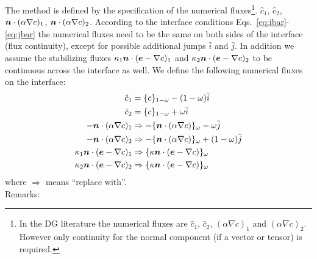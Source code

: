 The method is defined by the specification of the numerical fluxes\footnote{In
the DG literature the numerical fluxes are $\hat c_1$, $\hat c_2$, 
$(\alpha\nabla c)_1$ and $(\alpha\nabla c)_2$. However only continuity for
the normal component (if a vector or tensor) is required.}.
$\hat c_1$, $\hat c_2$, $\boldsymbol{n}\cdot(\alpha\nabla c)_1$,
$\boldsymbol{n}\cdot(\alpha\nabla c)_2$. 
According to the interface conditions Eqs.~\eqref{eq:ibar}-\eqref{eq:jbar} the
numerical fluxes need to be the same on both sides of the interface (flux
continuity), except for possible additional jumps $\bar i$ and $\bar j$. In
addition we assume the stabilizing fluxes 
$\kappa_1\boldsymbol{n}\cdot(\boldsymbol{e}- \nabla c)_1$
and $\kappa_2\boldsymbol{n}\cdot(\boldsymbol{e}- \nabla c)_2$ to be continuous across the
interface as well. We define the following numerical fluxes on the interface:
\begin{align}
   \hat c_1 &= \{c\}_{1-\omega}-(1-\omega)\bar i\\
   \hat c_2 &= \{c\}_{1-\omega}+\omega\bar i\\
   -\boldsymbol{n}\cdot(\alpha\nabla c)_1&\Rightarrow
            -\{\boldsymbol{n}\cdot(\alpha\nabla c)\}_\omega - \omega \bar j \\
   -\boldsymbol{n}\cdot(\alpha\nabla c)_2&\Rightarrow
            -\{\boldsymbol{n}\cdot(\alpha\nabla c)\}_\omega + (1-\omega)\bar j \\
   \kappa_1\boldsymbol{n}\cdot(\boldsymbol{e}- \nabla c)_1&\Rightarrow
            \{\kappa\boldsymbol{n}\cdot(\boldsymbol{e}- \nabla c)\}_\omega\\
   \kappa_2\boldsymbol{n}\cdot(\boldsymbol{e}- \nabla c)_2&\Rightarrow
            \{\kappa\boldsymbol{n}\cdot(\boldsymbol{e}- \nabla c)\}_\omega
\end{align}
where $\Rightarrow$ means ``replace with''.\\
Remarks:
